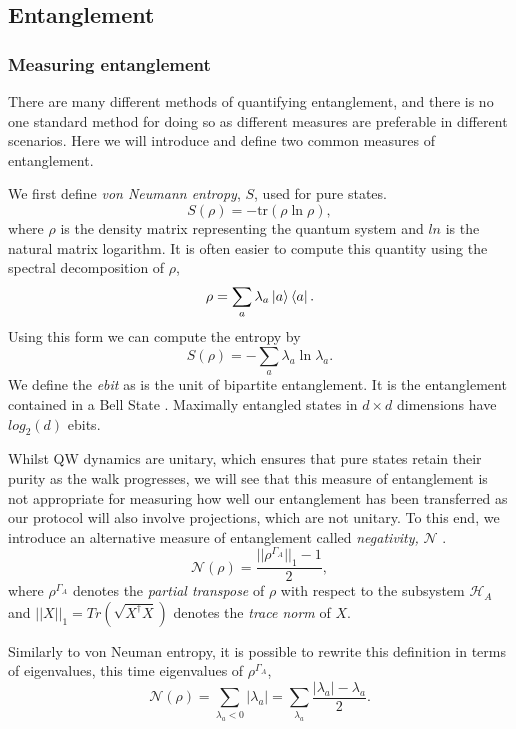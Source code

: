 \subsection{Entanglement}

\subsubsection{Measuring entanglement}
There are many different methods of quantifying entanglement, and there is no one standard method for doing so as different measures are preferable in different scenarios. 
Here we will introduce and define two common measures of entanglement.\newline

We first define \emph{von Neumann entropy}, $S$, used for pure states.
\begin{equation}
    S(\rho) = -\text{tr}(\rho \ln \rho),
\end{equation}
where $\rho$ is the density matrix representing the quantum system and $ln$ is the natural matrix logarithm. 
It is often easier to compute this quantity using the spectral decomposition of $\rho$,
\begin{equation}
    \rho = \sum_a \lambda_a \ket{a}\bra{a}.
\end{equation}
Using this form we can compute the entropy by
\begin{equation}
    S(\rho) = -\sum_a \lambda_a \ln\lambda_a.
\end{equation}
We define the \emph{ebit} as is the unit of bipartite entanglement. It is the entanglement contained in a Bell State \cite{Eisert_2000}. Maximally entangled states in $d \times d$ dimensions have $log_2(d)$ ebits.

Whilst QW dynamics are unitary, which ensures that pure states retain their purity as the walk progresses, we will see that this measure of entanglement is not appropriate for measuring how well our entanglement has been transferred as our protocol will also involve projections, which are not unitary.
To this end, we introduce an alternative measure of entanglement called \emph{negativity,} $\mathcal{N}$ \cite{Vidal_2002}.
\begin{equation}
    \mathcal{N}(\rho) = \frac{||\rho^{\Gamma_A}||_1-1}{2},
\end{equation}
where $\rho^{\Gamma_A}$ denotes the \emph{partial transpose} of $\rho$ with respect to the subsystem $\mathcal{H}_A$ and $||X||_1 = Tr(\sqrt{X^\dagger X})$ denotes the \emph{trace norm} of $X$.\newline

Similarly to von Neuman entropy, it is possible to rewrite this definition in terms of eigenvalues, this time eigenvalues of $\rho^{\Gamma_A}$,
\begin{equation}
    \mathcal{N}(\rho) = \sum_{\lambda_a < 0}|\lambda_a| = \sum_{\lambda_a} \frac{|\lambda_a| - \lambda_a}{2}.
\end{equation}